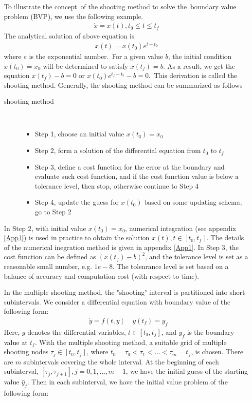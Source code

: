 To illustrate the concept of the shooting method to solve the boundary value problem (BVP), we use the following example.
\begin{align*}
	\dot{x} = x(t), t_0 \leq t \leq t_f 
\end{align*}
The analytical solution of above equation is 
\begin{align*}
	x(t) = x(t_0)e^{t - t_0}
\end{align*}
where $e$ is the exponential number. For a given value $b$, the initial condition $x(t_0) = x_0$ will be determined to satisfy $x(t_f) = b$. As a result, we get the equation $x(t_f)-b = 0$ or $x(t_0)e^{t_f - t_0}-b = 0$. This derivation is called the shooting method. Generally, the shooting method can be summarized as follows
\begin{description}
	\item[shooting method] \
	\begin{itemize}
		\item Step 1, choose an initial value $x(t_0)=x_0$ 
		\item Step 2, form a solution of the differential equation from $t_0$ to $t_f$
		\item Step 3, define a cost function for the error at the boundary and evaluate such cost function, and if the cost function value is below a tolerance level, then stop, otherwise continue to Step 4 
		\item Step 4, update the guess for $x(t_0)$ based on some updating schema, go to Step 2
	\end{itemize}
\end{description}
In Step 2, with initial value $x(t_0)=x_0$, numerical integration (see appendix \ref{App1}) is used in practice to obtain the solution $x(t), t \in [t_0, t_f]$. The details of the numerical inegration method is given in appendix \ref{App1}. In Step 3, the cost function can be defined as $(x(t_f)-b)^2$, and the tolerance level is set as a reasonable small number, e.g. $1e-8$. The tolenrance level is set based on a balance of accuracy and computation cost (with respect to time). 


In the multiple shooting method, the "shooting" interval is partitioned into short subintervals. We consider a differential equation with boundary value of the following form:
\begin{equation}\label{eqn:ori_dae}
	\begin{aligned}
		& \dot{y} = f(t, y) \
		& y(t_f) = y_f \
	\end{aligned}
\end{equation}
Here, $y$ denotes the differential variables, $t \in [t_0, t_f]$, and $y_f$ is the boundary value at $t_f$. With the multiple shooting method, a suitable grid of multiple shooting nodes $\tau_j \in [t_0,t_f]$, where $t_0 = \tau_0 < \tau_1 < ... < \tau_m = t_f$, is chosen. There are $m$ subintervals covering the whole interval. At the beginning of each subinterval, $[\tau_j, \tau_{j+1}], j = 0, 1, ..., m-1$, we have the initial guess of the starting value $\hat{y}_j$. Then in each subinterval, we have the initial value problem of the following form:


